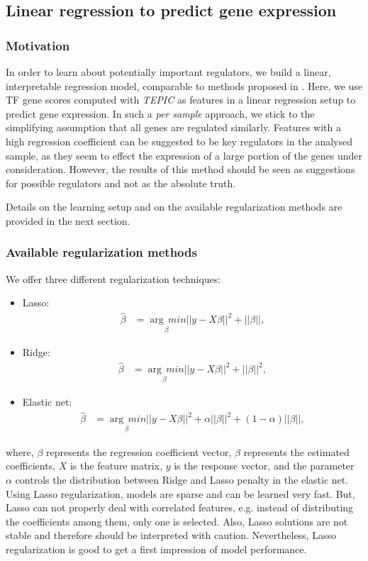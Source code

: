 \documentclass{article}
\begin{document}
\subsection{Linear regression to predict gene expression}
\subsubsection{Motivation}
In order to learn about potentially important regulators, we build a linear, interpretable regression model, 
comparable to methods proposed in \cite{pmid27899623,pmid22955983,pmid25231769,pmid22954627}.
Here, we use TF gene scores computed with \textit{TEPIC} as features in a linear regression setup to predict gene expression.
In such a \textit{per sample} approach, we stick to the simplifying assumption that all genes are regulated similarly. 
Features with a high regression coefficient can be suggested to be key regulators in the analysed sample, as they seem to effect the expression
of a large portion of the genes under consideration. However, the results of this method should be seen as suggestions for possible regulators and not as the absolute truth. 

Details on the learning setup and on the available regularization methods are provided in the next section.

\subsubsection{Available regularization methods}
We offer three different regularization techniques:
\begin{itemize}
\item Lasso:
\begin{align}
 \hat{\beta}&=\underset{\beta}{\arg\,min} ||y-X\beta||^2 + ||\beta||,
\end{align}
\item Ridge:
\begin{align}
 \hat{\beta}&=\underset{\beta}{\arg\,min} ||y-X\beta||^2 + ||\beta||^2,
\end{align}
\item Elastic net:
\begin{align}
 \hat{\beta}&=\underset{\beta}{\arg\,min} ||y-X\beta||^2 + \alpha||\beta||^2 + (1-\alpha)||\beta||,
\end{align}
\end{itemize}
where, $\beta$ represents the regression coefficient vector, $\hat{\beta}$ represents the estimated coefficients, $X$ is the feature matrix, $y$ is the response vector, and
the parameter $\alpha$ controls the distribution between Ridge and Lasso penalty in the elastic net.
\bigskip
\\Using Lasso regularization, models are sparse and can be learned very fast. 
But, Lasso can not properly deal with correlated features, e.g. instead of distributing the coefficients among them, only one is selected. Also, Lasso solutions are not stable and therefore should be interpreted with caution. Nevertheless, Lasso regularization is good to get a first impression of model performance. 
\end{document}
